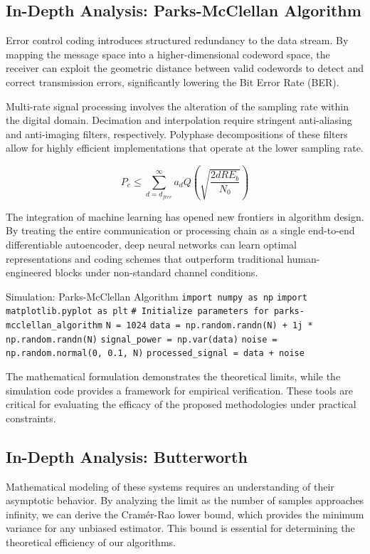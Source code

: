 \subsection{In-Depth Analysis: Parks-McClellan Algorithm}
Error control coding introduces structured redundancy to the data stream. By mapping the message space into a higher-dimensional codeword space, the receiver can exploit the geometric distance between valid codewords to detect and correct transmission errors, significantly lowering the Bit Error Rate (BER).

Multi-rate signal processing involves the alteration of the sampling rate within the digital domain. Decimation and interpolation require stringent anti-aliasing and anti-imaging filters, respectively. Polyphase decompositions of these filters allow for highly efficient implementations that operate at the lower sampling rate.

\begin{equation}
    P_e \leq \sum_{d=d_{free}}^{\infty} a_d Q\left(\sqrt{\frac{2 d R E_b}{N_0}}\right)
\end{equation}

The integration of machine learning has opened new frontiers in algorithm design. By treating the entire communication or processing chain as a single end-to-end differentiable autoencoder, deep neural networks can learn optimal representations and coding schemes that outperform traditional human-engineered blocks under non-standard channel conditions.

\begin{pythonbox}{Simulation: Parks-McClellan Algorithm}
\texttt{import numpy as np}
\texttt{import matplotlib.pyplot as plt}
\texttt{}
\texttt{\# Initialize parameters for parks-mcclellan\_algorithm}
\texttt{N = 1024}
\texttt{data = np.random.randn(N) + 1j * np.random.randn(N)}
\texttt{signal\_power = np.var(data)}
\texttt{noise = np.random.normal(0, 0.1, N)}
\texttt{processed\_signal = data + noise}
\end{pythonbox}

\vspace{0.5cm}
The mathematical formulation demonstrates the theoretical limits, while the simulation code provides a framework for empirical verification. These tools are critical for evaluating the efficacy of the proposed methodologies under practical constraints.


\subsection{In-Depth Analysis: Butterworth}
Mathematical modeling of these systems requires an understanding of their asymptotic behavior. By analyzing the limit as the number of samples approaches infinity, we can derive the Cramér-Rao lower bound, which provides the minimum variance for any unbiased estimator. This bound is essential for determining the theoretical efficiency of our algorithms.

